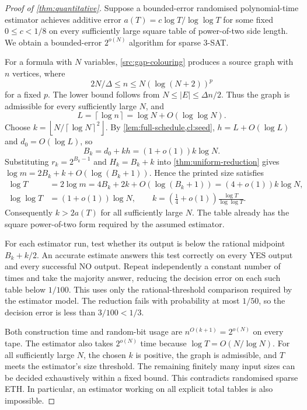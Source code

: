 \documentclass[11pt]{article} \usepackage[utf8]{inputenc}
\theoremstyle{plain} \newtheorem{theorem}{Theorem}[section]
\theoremstyle{definition} \newaliascnt{definition}{theorem}
\newcommand{\ceil}[1]{\left\lceil#1\right\rceil}
\newcommand{\floor}[1]{\left\lfloor#1\right\rfloor}
\begin{document}
\begin{proof}[Proof of \cref{thm:quantitative}]
Suppose a bounded-error randomised polynomial-time estimator achieves additive
error $a(T)=c\log T/\log\log T$ for some fixed $0\le c<1/8$ on every
sufficiently large square table of power-of-two side length. We obtain a
bounded-error $2^{o(N)}$ algorithm for sparse $3$-SAT.

For a formula with $N$ variables, \cref{src:gap-colouring} produces a source
graph with $n$ vertices, where
\[
2N/\Delta\le n\le N(\log(N+2))^p
\]
for a fixed $p$. The lower bound follows from $N\le|E|\le\Delta n/2$.
Thus the graph is admissible for every sufficiently large $N$, and
\[
L=\ceil{\log n}=\log N+O(\log\log N).
\]
Choose $k=\floor{N/\ceil{\log N}^{2}}$. By
\cref{lem:full-schedule,cl:seed}, $h=L+O(\log L)$ and $d_0=O(\log L)$, so
\[
B_k=d_0+kh=(1+o(1))k\log N.
\]
Substituting $r_k=2^{B_k-1}$ and $H_k=B_k+k$ into
\cref{thm:uniform-reduction} gives
$\log m=2B_k+k+O(\log(B_k+1))$. Hence the printed size satisfies
\begin{align}
\log T&=2\log m=4B_k+2k+O(\log(B_k+1))
             =(4+o(1))k\log N,\label{eq:quantitative-size}\\
\log\log T&=(1+o(1))\log N,
\qquad k=\left(\frac14+o(1)\right)\frac{\log T}{\log\log T}.
\end{align}
Consequently $k>2a(T)$ for all sufficiently large $N$. The table already has
the square power-of-two form required by the assumed estimator.

For each estimator run, test whether its output is below the rational midpoint
$B_k+k/2$. An accurate estimate answers this test correctly on every YES output
and every successful NO output. Repeat independently a constant number of times
and take the majority answer, reducing the decision error on each such table
below $1/100$. This uses only the rational-threshold comparison required by
the estimator model. The reduction
fails with probability at most $1/50$, so the decision error is less than
$3/100<1/3$.

Both construction time and random-bit usage are
$n^{O(k+1)}=2^{o(N)}$ on every tape. The estimator also takes
$2^{o(N)}$ time because
$\log T=O(N/\log N)$. For all sufficiently large $N$, the chosen $k$ is
positive, the graph is admissible, and $T$ meets the estimator's size threshold.
The remaining finitely many input sizes can be decided exhaustively within
a fixed bound. This contradicts randomised sparse
ETH. In particular, an estimator working on all explicit total tables is also
impossible.
\end{proof}
\end{document}
